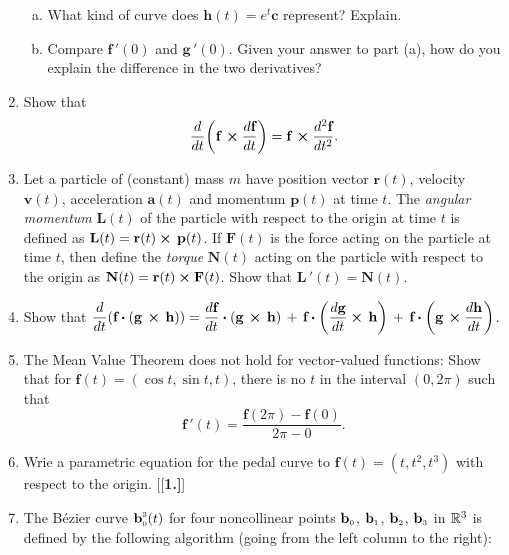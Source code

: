 \begin{enumerate}[\bfseries 1.]
\begin{enumerate}[(a)]
   \item What kind of curve does $\textbf{h}(t) = e^t\textbf{c}$ represent? Explain.
   \item Compare $\textbf{f}\,'(0)$ and $\textbf{g}\,'(0)$. 
   Given your answer to part (a), how do you explain the difference in the two derivatives?
  \end{enumerate}
 \item Show that 
 \[\dfrac{d}{dt} \biggl( \textbf{f}\, \bm{\times} \dfrac{d\textbf{f}}{dt} \biggr) =
  \textbf{f}\, \bm{\times} \dfrac{d^2 \textbf{f}}{dt^2}.\]
 \item Let a particle of (constant) mass $m$ have position vector $\textbf{r}(t)$, velocity $\textbf{v}(t)$,
  acceleration $\textbf{a}(t)$ and momentum $\textbf{p}(t)$ at time $t$. The \emph{angular momentum} $\textbf{L}(t)$ of
  the particle with respect to the origin at time $t$ is defined as $\textbf{L}(t) =
  \textbf{r}(t) \bm{\times} \,\textbf{p}(t)$. If $\textbf{F}(t)$ is the force acting on the particle at time $t$, then
  define the \emph{torque} $\textbf{N}(t)$ acting on the particle with respect to the origin as
  $\textbf{N}(t) = \textbf{r}(t) \bm{\times} \textbf{F}(t)$. Show that $\textbf{L}\,'(t) = \textbf{N}(t)$.
 \item Show that $\dfrac{d}{dt} ( \textbf{f} \bm{\cdot} ( \textbf{g}\, \bm{\times} \,\textbf{h} ) ) =
  \dfrac{d\textbf{f}}{dt} \bm{\cdot} (\textbf{g}\, \bm{\times} \,\textbf{h}) \,+\,
  \textbf{f} \bm{\cdot} \biggl(\dfrac{d \textbf{g}}{dt} \bm{\times} \,\textbf{h}\biggr) \,+\,
  \textbf{f} \bm{\cdot} \biggl(\textbf{g}\, \bm{\times} \dfrac{d \textbf{h}}{dt}\biggr)$.
 \item The Mean Value Theorem does not hold for vector-valued functions:
 Show that for $\textbf{f}(t) = (\cos t, \sin t,t)$, there is no $t$ in the interval $(0,2\pi)$ such that
 \begin{displaymath}
  \textbf{f}\,'(t) = \dfrac{\textbf{f}(2\pi) - \textbf{f}(0)}{2\pi - 0} .
 \end{displaymath}
 \item Wrie a parametric equation for the pedal curve to $\textbf{f}(t)=(t,t^2,t^3)$ with respect to the origin.
[{[\bfseries 1.]}]
 \item The B\'{e}zier curve $\textbf{b}_{\scriptscriptstyle 0}^{\scriptscriptstyle 3}(t)$ for four noncollinear points
  $\textbf{b}_{\scriptscriptstyle 0}$, $\textbf{b}_{\scriptscriptstyle 1}$, $\textbf{b}_{\scriptscriptstyle 2}$, $\textbf{b}_{\scriptscriptstyle 3}$ in $\mathbb{R}^{3}$ is
  defined by the following algorithm (going from the left column to the right):

\end{enumerate}

